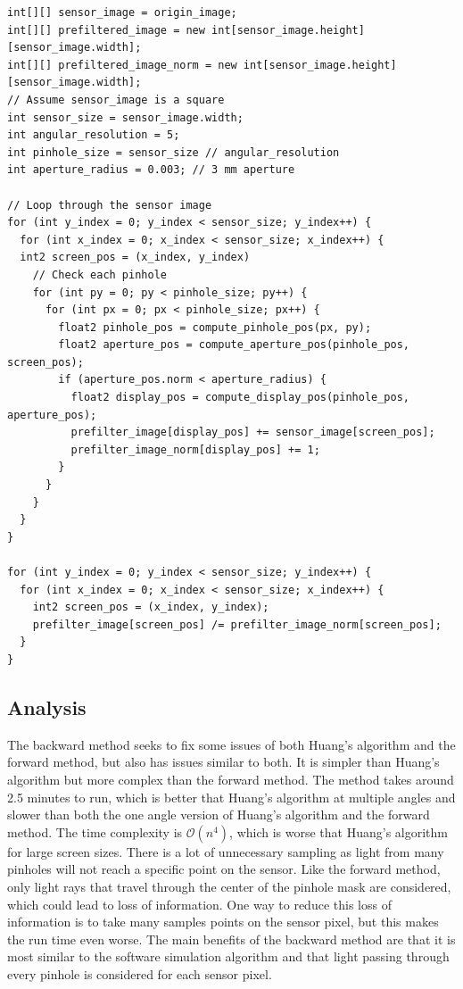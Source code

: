 \begin{lstlisting}[frame=single, basicstyle=\footnotesize\ttfamily, columns=fullflexible, caption=Pseudocode For Backward Method \protect \footnote{The R, G, and B channels are ignored for simplicity.}]
int[][] sensor_image = origin_image;
int[][] prefiltered_image = new int[sensor_image.height][sensor_image.width];
int[][] prefiltered_image_norm = new int[sensor_image.height][sensor_image.width];
// Assume sensor_image is a square
int sensor_size = sensor_image.width;
int angular_resolution = 5;
int pinhole_size = sensor_size // angular_resolution
int aperture_radius = 0.003; // 3 mm aperture

// Loop through the sensor image
for (int y_index = 0; y_index < sensor_size; y_index++) {
  for (int x_index = 0; x_index < sensor_size; x_index++) {
  int2 screen_pos = (x_index, y_index)
    // Check each pinhole
    for (int py = 0; py < pinhole_size; py++) {
      for (int px = 0; px < pinhole_size; px++) {
        float2 pinhole_pos = compute_pinhole_pos(px, py);
        float2 aperture_pos = compute_aperture_pos(pinhole_pos, screen_pos);
        if (aperture_pos.norm < aperture_radius) {
          float2 display_pos = compute_display_pos(pinhole_pos, aperture_pos);
          prefilter_image[display_pos] += sensor_image[screen_pos];
          prefilter_image_norm[display_pos] += 1;
        }
      }
    }
  }
}

for (int y_index = 0; y_index < sensor_size; y_index++) {
  for (int x_index = 0; x_index < sensor_size; x_index++) {
    int2 screen_pos = (x_index, y_index);
    prefilter_image[screen_pos] /= prefilter_image_norm[screen_pos];
  }
}
\end{lstlisting}

\subsection{Analysis}
The backward method seeks to fix some issues of both Huang's algorithm and the forward method, but also has issues similar to both. It is simpler than Huang's algorithm but more complex than the forward method. The method takes around 2.5 minutes to run, which is better that Huang's algorithm at multiple angles and slower than both the one angle version of Huang's algorithm and the forward method. The time complexity is $\mathcal{O}(n^4)$, which is worse that Huang's algorithm for large screen sizes. There is a lot of unnecessary sampling as light from many pinholes will not reach a specific point on the sensor. Like the forward method, only light rays that travel through the center of the pinhole mask are considered, which could lead to loss of information. One way to reduce this loss of information is to take many samples points on the sensor pixel, but this makes the run time even worse. The main benefits of the backward method are that it is most similar to the software simulation algorithm and that light passing through every pinhole is considered for each sensor pixel. 

